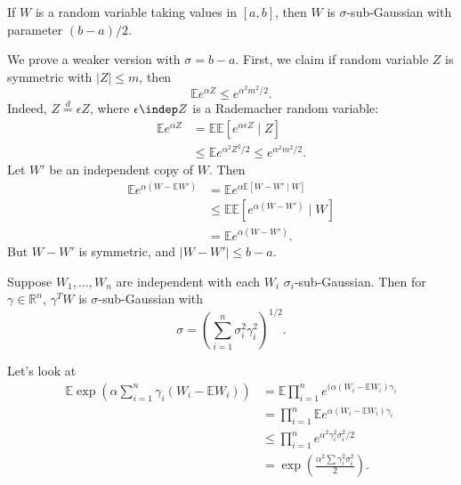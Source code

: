 \documentclass[12pt]{article}
\begin{document}
\begin{lemma}
	If $W$ is a random variable taking values in $[a, b]$, then $W$ is $\sigma$-sub-Gaussian with parameter $(b-a)/2$.
\end{lemma}

\begin{proofbox}
	We prove a weaker version with $\sigma = b - a$. First, we claim if random variable $Z$ is symmetric with $|Z| \leq m$, then
	\[
	\mathbb{E} e^{\alpha Z} \leq e^{\alpha^2m^2/2}.
	\]
	Indeed, $Z \overset d= \epsilon Z$, where $\epsilon \indep Z$ is a Rademacher random variable:
	\begin{align*}
		\mathbb{E} e^{\alpha Z} &= \mathbb{E} \mathbb{E}[e^{\alpha \epsilon Z} \mid Z] \\
					&\leq \mathbb{E} e^{\alpha^2 Z^2/2} \leq e^{\alpha^2 m^2/2}.
	\end{align*}
	Let $W'$ be an independent copy of $W$. Then
	\begin{align*}
		\mathbb{E} e^{\alpha(W - \mathbb{E} W')} &= \mathbb{E} e^{\alpha \mathbb{E}[W - W'\mid W]} \\
							 &\leq \mathbb{E}\mathbb{E}[ e^{\alpha(W - W')} \mid W] \\
							 &= \mathbb{E} e^{\alpha(W - W')}.
	\end{align*}
	But $W - W'$ is symmetric, and $|W - W'| \leq b - a$.
\end{proofbox}

\begin{proposition}
	Suppose $W_1, \ldots, W_n$ are independent with each $W_i$ $\sigma_i$-sub-Gaussian. Then for $\gamma \in \mathbb{R}^n$, $\gamma^T W$ is $\sigma$-sub-Gaussian with
	\[
	\sigma = \left( \sum_{i = 1}^n \sigma_i^2 \gamma_i^2 \right)^{1/2}.
	\]
\end{proposition}


\begin{proofbox}
	Let's look at
	\begin{align*}
		\mathbb{E} \exp \left( \alpha \sum_{i = 1}^n \gamma_i(W_i - \mathbb{E}W_i) \right) &= \mathbb{E} \prod_{i = 1}^n e^{(\alpha(W_i - \mathbb{E} W_i)\gamma_i} \\
												   &= \prod_{i= 1}^n \mathbb{E} e^{\alpha(W_i - \mathbb{E} W_i)\gamma_i} \\
												   &\leq \prod_{i = 1}^n e^{\alpha^2 \gamma_i^2 \sigma_i^2/2} \\
												   &= \exp \left( \frac{\alpha^2 \sum \gamma_i^2 \sigma_i^2}{2} \right).
	\end{align*}
\end{proofbox}
\end{document}
